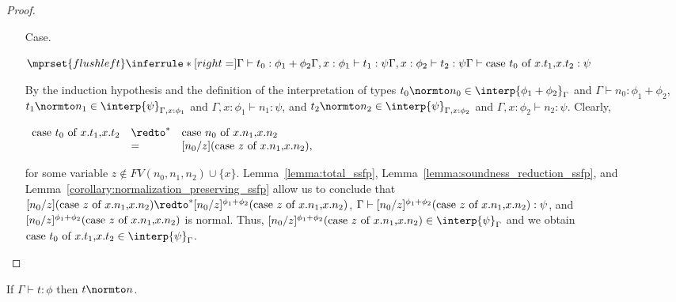 \begin{proof}
\begin{itemize}
\item[Case.]\ \\
  \begin{center}
    \begin{math}
      $$\mprset{flushleft}
      \inferrule* [right=] {
        \Gamma \vdash t_0:\phi_1 + \phi_2
        \\
	\Gamma,x:\phi_1 \vdash t_1:\psi
        \\
	\Gamma,x:\phi_2 \vdash t_2:\psi
      }{\Gamma \vdash \ccon{t_0}{x}{t_1}{t_2}: \psi}
    \end{math}
  \end{center}
  By the induction hypothesis and the definition of the interpretation of types
  $t_0 \normto n_0 \in \interp{\phi_1 + \phi_2}_\Gamma$ and $\Gamma \vdash n_0:\phi_1+\phi_2$, 
  $t_1 \normto n_1 \in \interp{\psi}_{\Gamma,x:\phi_1}$ and $\Gamma,x:\phi_1 \vdash n_1:\psi$, and
  $t_2 \normto n_2 \in \interp{\psi}_{\Gamma,x:\phi_2}$ and  $\Gamma,x:\phi_2 \vdash n_2:\psi$.  
  Clearly, 
  \begin{center}
    \begin{math}
      \begin{array}{lll}
        \ccon{t_0}{x}{t_1}{t_2} & \redto^* & \ccon{n_0}{x}{n_1}{n_2}\\
        & =        & [n_0/z](\ccon{z}{x}{n_1}{n_2}),
      \end{array}
    \end{math}
  \end{center}
  for some variable $z \not \in FV(n_0,n_1,n_2) \cup \{x\}$.  Lemma~\ref{lemma:total_ssfp}, 
  Lemma~\ref{lemma:soundness_reduction_ssfp}, and Lemma~\ref{corollary:normalization_preserving_ssfp} 
  allow us to conclude that $[n_0/z](\ccon{z}{x}{n_1}{n_2}) \redto^* [n_0/z]^{\phi_1+\phi_2}(\ccon{z}{x}{n_1}{n_2})$,
  $\Gamma \vdash [n_0/z]^{\phi_1+\phi_2}(\mbox{case}\ z\ \text{of}\ x\text{.}n_1\text{,}x\text{.}n_2) :\psi$, and $[n_0/z]^{\phi_1+\phi_2}(\mbox{case}\ z\ \text{of}\ x\text{.}n_1\text{,}x\text{.}n_2)$
  is normal.  Thus, $[n_0/z]^{\phi_1+\phi_2}(\ccon{z}{x}{n_1}{n_2}) \in \interp{\psi}_\Gamma$ and we obtain 
  $\ccon{t_0}{x}{t_1}{t_2} \in \interp{\psi}_\Gamma$. 
\end{itemize}
\end{proof}

\begin{corollary}[Normalization]
  If $\Gamma \vdash t:\phi$ then $t \normto n$.
\end{corollary}

